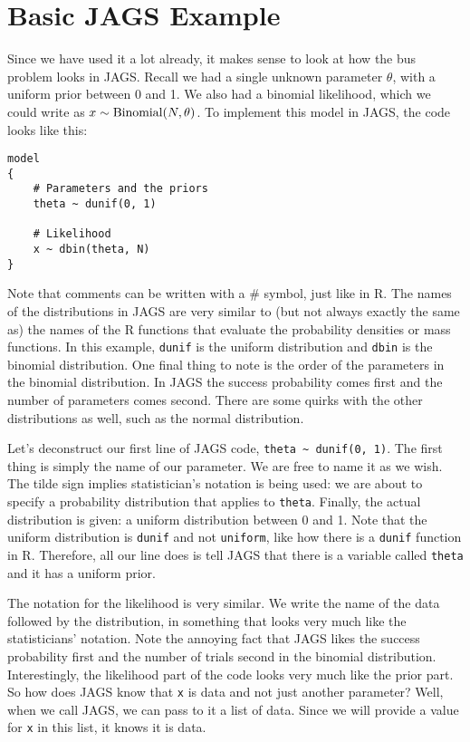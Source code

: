 \section{Basic JAGS Example}
Since we have used it a lot already, it makes sense to look at how the bus
problem looks in JAGS. Recall we had a
single unknown parameter $\theta$, with a uniform prior between 0 and 1.
We also had a binomial likelihood, which we could write as
$x \sim \textnormal{Binomial}(N, \theta)$.
To implement this model in JAGS, the code looks like this:
\begin{framed}
\begin{verbatim}
model
{
    # Parameters and the priors
    theta ~ dunif(0, 1)

    # Likelihood
    x ~ dbin(theta, N)
}
\end{verbatim}
\end{framed}
Note that comments can be written with a \# symbol, just like in R.
The names of the distributions in JAGS are very similar to (but not always
exactly the same as) the names of the R functions that evaluate the probability
densities or mass functions. In this example, {\tt dunif} is the uniform
distribution and {\tt dbin} is the binomial distribution. One final thing to
note is the order of the parameters in the binomial distribution. In JAGS the
success probability comes first and the number of parameters comes second.
There are some quirks with the other distributions as well, such as the normal
distribution.

Let's deconstruct our first line of JAGS code, {\tt theta \~{ } dunif(0, 1)}. The
first thing is simply the name of our parameter. We are free to name it as we
wish. The tilde sign implies statistician's notation is being used: we are
about to specify a probability distribution that applies to {\tt theta}. Finally,
the actual distribution is given: a uniform distribution between 0 and 1. Note
that the uniform distribution is {\tt dunif} and not {\tt uniform}, like how
there is a {\tt dunif} function in R. Therefore, all our line does is tell JAGS
that there is a variable called {\tt theta} and it has a uniform prior.

The notation for the likelihood is very similar. We write the name of the data
followed by the distribution, in something that looks very much like the
statisticians' notation. Note the annoying fact that JAGS likes the success
probability first and the number of trials second in the binomial distribution.
Interestingly, the likelihood part of the code looks very much like the
prior part. So how does JAGS know that {\tt x} is data and not just another
parameter? Well, when we call JAGS, we can pass to it a list of data. Since we
will provide a value for {\tt x} in this list, it knows it is data.

